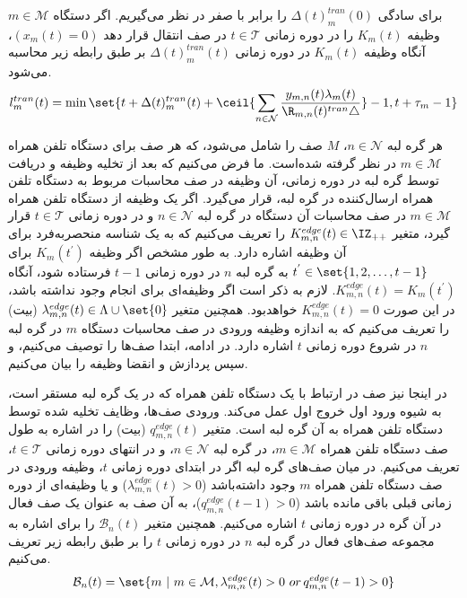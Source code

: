 برای سادگی $\Delta(t)_m^{tran}(0)$ را برابر با صفر در نظر می‌گیریم.
اگر دستگاه $m \in \mathcal{M}$ وظیفه $K_m(t)$ را در دوره زمانی $t \in \mathcal{T}$ در صف انتقال قرار دهد $(x_m(t) = 0)$، آنگاه وظیفه $K_m(t)$ در دوره زمانی $\Delta(t)_m^{tran}(t)$ بر طبق رابطه زیر محاسبه می‌شود.
\begin{alignat}{2}
	l_m^{tran}(t) = \min \set{t + \Delta(t)_m^{tran}(t) + \ceil{\sum_{n \in \mathcal{N}} {y_{m,n}(t)\lambda_m(t) \over \R_{m,n}(t)^{tran}\bigtriangleup}} - 1, t + \tau_m - 1}
	\label{6}  
\end{alignat}



هر گره لبه $n \in \mathcal{N}$، $M$ صف را شامل می‌شود، که هر صف برای دستگاه تلفن همراه $m \in \mathcal{M}$ در نظر گرفته شده‌است. ما فرض می‌کنیم که بعد از تخلیه وظیفه و دریافت توسط گره لبه در دوره زمانی، آن وظیفه در صف محاسبات مربوط به دستگاه تلفن همراه ارسال‌کننده در گره لبه، قرار می‌گیرد.   
اگر یک وظیفه از دستگاه تلفن همراه $m \in \mathcal{M}$ در صف محاسبات آن دستگاه در گره لبه $n \in \mathcal{N}$ و در دوره زمانی $t \in \mathcal{T}$ قرار گیرد، متغیر $K_{m,n}^{edge}(t) \in \IZ_{++}$ را تعریف می‌کنیم که به یک شناسه منحصربه‌فرد برای آن وظیفه اشاره دارد. به طور مشخص اگر وظیفه $K_m(t^{'})$ برای $t^{'} \in \set{1,2, \ldots, t-1}$ به گره لبه $n$ در دوره زمانی $t-1$ فرستاده شود، آنگاه $K_{m,n}^{edge}(t) = K_m(t^{'})$. لازم به ذکر است اگر وظیفه‌ای برای انجام وجود نداشته باشد، در این صورت $K_{m,n}^{edge}(t) = 0$ خواهدبود. همچنین متغیر $\lambda_{m,n}^{edge}(t) \in \Lambda \cup \set{0}$ (بیت) را تعریف می‌کنیم که به اندازه وظیفه ورودی در صف محاسبات دستگاه $m$ در گره لبه $n$ در شروع دوره زمانی $t$ اشاره دارد. 
در ادامه، ابتدا صف‌ها را توصیف می‌کنیم، و سپس
پردازش و انقضا وظیفه را بیان می‌کنیم.





در اینجا نیز صف در ارتباط با یک دستگاه تلفن همراه که در یک گره لبه مستقر است، به شیوه ورود اول خروج اول عمل می‌کند. ورودی صف‌ها، وظایف تخلیه شده توسط دستگاه تلفن همراه به آن گره لبه است. متغیر $q_{m,n}^{edge}(t)$ (بیت) را در اشاره به طول صف دستگاه تلفن همراه $m \in \mathcal{M}$، در گره لبه $n \in \mathcal{N}$، و در انتهای دوره زمانی $t \in \mathcal{T}$، تعریف می‌کنیم. در میان صف‌های گره لبه اگر در ابتدای دوره زمانی $t$، وظیفه ورودی در صف دستگاه تلفن همراه $m$ وجود داشته‌باشد ($\lambda_{m,n}^{edge}(t)>0$) و یا وظیفه‌ای از دوره زمانی قبلی باقی مانده باشد ($q_{m,n}^{edge}(t-1)>0$)، به آن صف به عنوان یک صف فعال در آن گره در دوره زمانی $t$ اشاره می‌کنیم. همچنین متغیر $\mathcal{B}_n(t)$ را برای اشاره به مجموعه صف‌های فعال در گره لبه $n$ در دوره زمانی $t$ را بر طبق رابطه زیر تعریف می‌کنیم.
\begin{alignat}{2}
	\mathcal{B}_n(t) = \set{m \ | \ m \in \mathcal{M}, \lambda_{m,n}^{edge}(t)>0 \ or \,  q_{m,n}^{edge}(t-1)>0}
	\label{7}  
\end{alignat}


